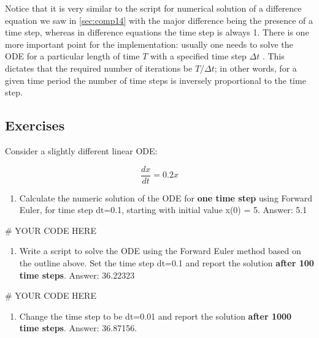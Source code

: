 \documentclass[
  letterpaper,
  DIV=11,
  numbers=noendperiod]{scrreprt}
\newenvironment{Shaded}{\begin{snugshade}}{\end{snugshade}}
\newcommand{\CommentTok}[1]{\textcolor[rgb]{0.37,0.37,0.37}{#1}}
\providecommand{\tightlist}{%
  \setlength{\itemsep}{0pt}\setlength{\parskip}{0pt}}\usepackage{longtable,booktabs,array}
\begin{document}
Notice that it is very similar to the script for numerical solution of a
difference equation we saw in \ref{sec:comp14} with the major difference
being the presence of a time step, whereas in difference equations the
time step is always 1. There is one more important point for the
implementation: usually one needs to solve the ODE for a particular
length of time \(T\) with a specified time step \(\Delta t\) . This
dictates that the required number of iterations be \(T/\Delta t\); in
other words, for a given time period the number of time steps is
inversely proportional to the time step.

\hypertarget{exercises-18}{%
\subsection{Exercises}\label{exercises-18}}

Consider a slightly different linear ODE:

\[
\frac{dx}{dt} =  0.2 x 
\]

\begin{enumerate}
\def\labelenumi{\arabic{enumi}.}
\tightlist
\item
  Calculate the numeric solution of the ODE for \textbf{one time step}
  using Forward Euler, for time step dt=0.1, starting with initial value
  x(0) = 5. Answer: 5.1
\end{enumerate}

\begin{Shaded}
\begin{Highlighting}[]
\CommentTok{\# YOUR CODE HERE}
\end{Highlighting}
\end{Shaded}

\begin{enumerate}
\def\labelenumi{\arabic{enumi}.}
\setcounter{enumi}{1}
\tightlist
\item
  Write a script to solve the ODE using the Forward Euler method based
  on the outline above. Set the time step dt=0.1 and report the solution
  \textbf{after 100 time steps}. Answer: 36.22323
\end{enumerate}

\begin{Shaded}
\begin{Highlighting}[]
\CommentTok{\# YOUR CODE HERE}
\end{Highlighting}
\end{Shaded}

\begin{enumerate}
\def\labelenumi{\arabic{enumi}.}
\setcounter{enumi}{2}
\tightlist
\item
  Change the time step to be dt=0.01 and report the solution
  \textbf{after 1000 time steps}. Answer: 36.87156.
\end{enumerate}
\end{document}
